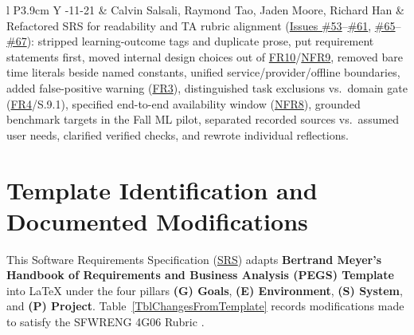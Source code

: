 \documentclass[11pt]{article}
\newcommand{\SRS}{\hyperlink{acr-srs}{SRS}}
\begin{document}
{\begin{tabularx}{\textwidth}{l P{3.9cm} Y}
-11-21 & Calvin Salsali, Raymond Tao, Jaden Moore, Richard Han & Refactored SRS for readability and TA rubric alignment (\href{https://github.com/richy1337/Verity/issues/53}{Issues \#53}--\href{https://github.com/richy1337/Verity/issues/61}{\#61}, \href{https://github.com/richy1337/Verity/issues/65}{\#65}--\href{https://github.com/richy1337/Verity/issues/67}{\#67}): stripped learning-outcome tags and duplicate prose, put requirement statements first, moved internal design choices out of \hyperref[FR10]{FR10}/\hyperref[NFR9]{NFR9}, removed bare time literals beside named constants, unified service/provider/offline boundaries, added false-positive warning (\hyperref[FR3]{FR3}), distinguished task exclusions vs.\ domain gate (\hyperref[FR4]{FR4}/S.9.1), specified end-to-end availability window (\hyperref[NFR8]{NFR8}), grounded benchmark targets in the Fall ML pilot, separated recorded sources vs.\ assumed user needs, clarified verified checks, and rewrote individual reflections.\\
\bottomrule
\end{tabularx}
}

\section*{Template Identification and Documented Modifications}

This Software Requirements Specification (\SRS{}) adapts \textbf{Bertrand Meyer's Handbook of Requirements and Business Analysis (PEGS) Template} \cite{Meyer2022} into \LaTeX{} under the four pillars \textbf{(G) Goals}, \textbf{(E) Environment}, \textbf{(S) System}, and \textbf{(P) Project}. Table~\ref{TblChangesFromTemplate} records modifications made to satisfy the SFWRENG 4G06 Rubric \cite{SmithCapTemplate}.
\end{document}
